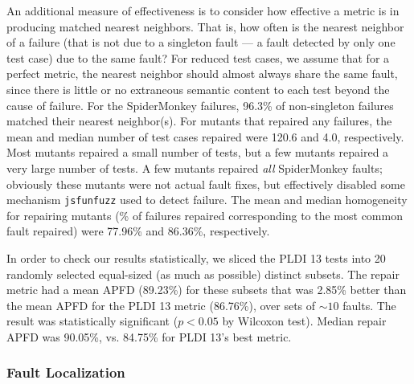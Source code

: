 An additional measure of effectiveness is to consider how effective a metric is in producing matched nearest neighbors.  That is, how often is the nearest neighbor of a failure (that is not due to a singleton fault --- a fault detected by only one test case) due to the same fault?  For reduced \cite{DD,PLDI13,
CReduce} test cases, we assume that for a perfect metric, the nearest neighbor should almost always share the same fault, since there is little or no extraneous semantic content to each test beyond the cause of failure.  For the SpiderMonkey failures, 96.3\% of non-singleton failures matched their nearest neighbor(s).  For mutants that repaired any failures, the mean and median number of test cases repaired were 120.6 and 4.0, respectively.  Most mutants repaired a small number of tests, but a few mutants repaired a very large number of tests.  A few mutants repaired \emph{all} SpiderMonkey faults; obviously these mutants were not actual fault fixes, but effectively disabled some mechanism {\tt jsfunfuzz} used to detect failure. The mean and median homogeneity for repairing mutants (\% of failures repaired corresponding to the most common fault repaired) were 77.96\% and 86.36\%, respectively.  

In order to check our results statistically, we sliced the PLDI 13 tests into 20 randomly selected equal-sized (as much as possible) distinct subsets.  The repair metric had a mean APFD (89.23\%) for these subsets that was 2.85\% better than the mean APFD for the PLDI 13 metric (86.76\%), over sets of $\sim 10$ faults. The result was statistically significant ($p < 0.05$ by Wilcoxon test).   Median repair APFD was 90.05\%, vs. 84.75\% for PLDI 13's best metric.


\subsubsection{Fault Localization}

